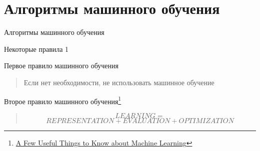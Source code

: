 \documentclass[aspectratio=169]{beamer}
\begin{document}

\section{Алгоритмы машинного обучения}


\begin{frame}{}

\begin{center}
\Large Алгоритмы машинного обучения
\end{center}

\end{frame}

\begin{frame}{Некоторые правила 1}

Первое правило машинного обучения
\begin{quote}
Если нет необходимости, не использовать машинное обучение
\end{quote}

Второе правило машинного обучения\footnote{\href{https://homes.cs.washington.edu/~pedrod/papers/cacm12.pdf}{A Few Useful Things to Know about Machine Learning}}
\begin{quote}
\[
LEARNING =
\]
\[
REPRESENTATION + EVALUATION + OPTIMIZATION
\]
\end{quote}

\end{frame}
\end{document}

